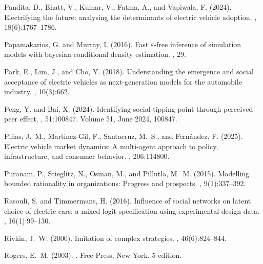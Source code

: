 \documentclass[12pt]{article}
\begin{document}
\begin{thebibliography}{}
Pandita, D., Bhatt, V., Kumar, V., Fatma, A., and Vapiwala, F. (2024).
\newblock Electrifying the future: analysing the determinants of electric
  vehicle adoption.
,
  18(6):1767--1786.

Papamakarios, G. and Murray, I. (2016).
\newblock Fast $\varepsilon$-free inference of simulation models with bayesian
  conditional density estimation.
, 29.

Park, E., Lim, J., and Cho, Y. (2018).
\newblock Understanding the emergence and social acceptance of electric
  vehicles as next-generation models for the automobile industry.
, 10(3):662.

Peng, Y. and Bai, X. (2024).
\newblock Identifying social tipping point through perceived peer effect.
, 51:100847.
\newblock Volume 51, June 2024, 100847.

Piñas, J.~M., Martinez-Gil, F., Santacruz, M.~S., and Fernández, F. (2025).
\newblock Electric vehicle market dynamics: A multi-agent approach to policy,
  infrastructure, and consumer behavior.
, 206:114800.

Puranam, P., Stieglitz, N., Osman, M., and Pillutla, M.~M. (2015).
\newblock Modelling bounded rationality in organizations: Progress and
  prospects.
, 9(1):337--392.

Rasouli, S. and Timmermans, H. (2016).
\newblock Influence of social networks on latent choice of electric cars: a
  mixed logit specification using experimental design data.
, 16(1):99--130.

Rivkin, J.~W. (2000).
\newblock Imitation of complex strategies.
, 46(6):824--844.

Rogers, E.~M. (2003).
.
\newblock Free Press, New York, 5 edition.


\end{thebibliography}
\end{document}
